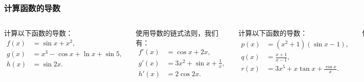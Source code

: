 \documentclass[
10pt,
aspectratio=43,
]{beamer}
\begin{document}
\begin{frame}
	\frametitle{计算函数的导数}
	\begin{columns}
		\centering
		计算以下函数的导数：
		\begin{align*}
			f(x) & = \sin x + x^2,                  \\
			g(x) & = x^3 - \cos x + \ln x + \sin 5, \\
			h(x) & = \sin 2x.
		\end{align*}

		\pause
		使用导数的链式法则，我们有：
		\begin{align*}
			f'(x) & = \cos x + 2x,                 \\
			g'(x) & = 3x^2 + \sin x + \frac{1}{x}, \\
			h'(x) & = 2\cos 2x.
		\end{align*}

		\centering
		计算以下函数的导数：
		\begin{align*}
			p(x) & = (x^2 + 1)(\sin x - 1),             \\
			q(x) & = \frac{x+1}{x-1},                   \\
			r(x) & = 3x^5 + x\tan x + \frac{\cos x}{x}.
		\end{align*}

		\pause
		使用导数的乘积法则和商法则，我们有：
		\begin{align*}
			p'(x) & = (2x)(\sin x - 1) + (x^2 + 1)(\cos x),           \\
			q'(x) & = -\frac{2}{(x-1)^2},                             \\
			r'(x) & = 15x^4 + \tan x + x\sec^2 x - \frac{\sin x}{x^2} \\
			      & \,\,\,\,\,\,\,-\frac{\cos (x)}{x^2}.
		\end{align*}
	\end{columns}
\end{frame}
\end{document}
